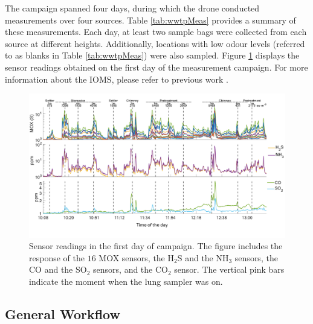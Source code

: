 \documentclass[final,3p,times,twocolumn]{elsarticle}
\begin{document}
The campaign spanned four days, during which the drone conducted measurements over four sources. Table \ref{tab:wwtpMeas} provides a summary of these measurements. Each day, at least two sample bags were collected from each source at different heights. Additionally, locations with low odour levels (referred to as blanks in Table \ref{tab:wwtpMeas}) were also sampled. Figure \ref{fig:rawData} displays the sensor readings obtained on the first day of the measurement campaign. For more information about the IOMS, please refer to previous work \cite{Burgues2020,Burgues2021}.

\begin{figure}[ht!]
    \centering
    \includegraphics[width=1\linewidth]{fig3_2.pdf}
    \caption{Sensor readings in the first day of campaign. The figure includes the response of the $16$ MOX sensors, the H$_{2}$S and the NH$_{3}$ sensors, the CO and the SO$_{2}$ sensors, and the CO$_{2}$ sensor. The vertical pink bars indicate the moment when the lung sampler was on.}
    \label{fig:rawData}
\end{figure}


\subsection{General Workflow}
\label{ssec:genWorkflow}
\end{document}

